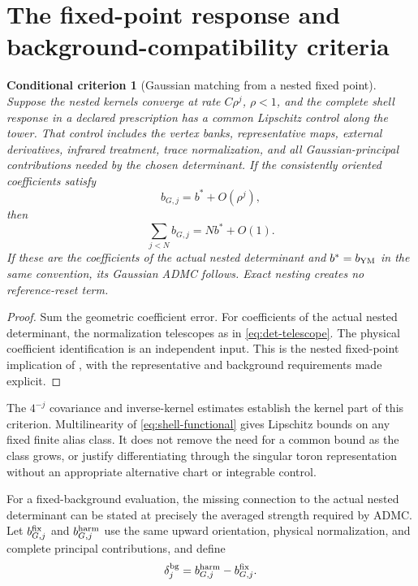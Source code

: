 \documentclass[11pt,oneside,openany]{book}
\newtheorem{criterion}[criterion]{Conditional criterion}
\theoremstyle{definition}
\theoremstyle{remark}
\newcommand{\src}[2]{\cite[#2]{#1}}
\begin{document}
\section{The fixed-point response and background-compatibility criteria}
\label{sec:background-matching}
\begin{criterion}[Gaussian matching from a nested fixed point]
\label{thm:fixedpoint-anomaly}
Suppose the nested kernels converge at rate $C\rho^j$, $\rho<1$, and the
complete shell response in a declared prescription has a common Lipschitz
control along the tower. That control includes the vertex banks,
representative maps, external derivatives, infrared treatment, trace
normalization, and all Gaussian-principal contributions needed by the
chosen determinant. If the consistently oriented coefficients satisfy
\[
b_{G,j}=b^*+O(\rho^j),
\]
then
\begin{equation}\label{eq:fixedpoint-ADMC}
\sum_{j<N}b_{G,j}=Nb^*+O(1).
\end{equation}
If these are the coefficients of the actual nested determinant and
$b^*=b_{\rm YM}$ in the same convention, its Gaussian ADMC follows.
Exact nesting creates no reference-reset term.
\end{criterion}
\begin{proof}
Sum the geometric coefficient error. For coefficients of the actual
nested determinant, the normalization telescopes as in
\cref{eq:det-telescope}. The physical coefficient identification is an
independent input. This is the nested fixed-point implication of
\src{F11}{V34, V38}, with the representative and background requirements
made explicit.
\end{proof}

The $4^{-j}$ covariance and inverse-kernel estimates establish the kernel
part of this criterion. Multilinearity of \cref{eq:shell-functional}
gives Lipschitz bounds on any fixed finite alias class. It does not remove
the need for a common bound as the class grows, or justify differentiating
through the singular toron representation without an appropriate
alternative chart or integrable control.

For a fixed-background evaluation, the missing connection to the actual
nested determinant can be stated at precisely the averaged strength
required by ADMC. Let $b_{G,j}^{\rm fix}$ and $b_{G,j}^{\rm harm}$ use the
same upward orientation, physical normalization, and complete principal
contributions, and define
\begin{equation}\label{eq:background-defect}
\delta_j^{\rm bg}=b_{G,j}^{\rm harm}-b_{G,j}^{\rm fix}.
\end{equation}
\end{document}
